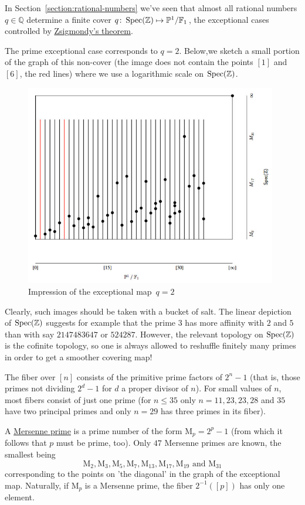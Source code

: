 In Section~\ref{section:rational-numbers} we've seen that almost all rational numbers $q \in \mathbb{Q}$ determine a finite cover $q\colon\operatorname{Spec}(\mathbb{Z}) \mapsto \mathbb{P}^1 / \mathbb{F}_1$, the exceptional cases controlled by \href{http://en.wikipedia.org/wiki/Zsigmondy's_theorem}{Zsigmondy's theorem}.

The prime exceptional case corresponds to $q=2$. Below,we sketch a small portion of the graph of this non-cover (the image does not contain the points $[1]$ and $[6]$, the red lines) where we use a logarithmic scale on $\operatorname{Spec}(\mathbb{Z})$.

\begin{figure}[ht]
  \centering
  \includegraphics[width=11cm]{exceptional-map/mersenne.jpg}
  \caption{Impression of the exceptional map~$q=2$}
  \label{figure:mersenne}
\end{figure}

Clearly, such images should be taken with a bucket of salt. The linear depiction of $\operatorname{Spec}(\mathbb{Z})$ suggests for example that the prime $3$ has more affinity with $2$ and $5$ than with say $2147483647$ or $524287$. However, the relevant topology on $\operatorname{Spec}(\mathbb{Z})$ is the cofinite topology, so one is always allowed to reshuffle finitely many primes in order to get a smoother covering  map!

The fiber over $[n]$ consists of the primitive prime factors of $2^n-1$ (that is, those primes not dividing $2^d-1$ for $d$ a proper divisor of $n$). For small values of $n$, most fibers consist of just one prime (for $n \leq 35$ only $n=11,23,23,28$ and $35$ have two principal primes and only $n=29$ has three primes in its fiber).

A \href{http://en.wikipedia.org/wiki/Mersenne_prime}{Mersenne prime} is a prime number of the form $\mathrm{M}_p = 2^p-1$ (from which it follows that $p$ must be prime, too). Only $47$ Mersenne primes are known, the smallest being
\begin{equation}
  \mathrm{M}_2,\mathrm{M}_3,\mathrm{M}_5,\mathrm{M}_7,\mathrm{M}_{13},\mathrm{M}_{17},\mathrm{M}_{19}\text{ and }\mathrm{M}_{31}
\end{equation}
corresponding to the points on 'the diagonal' in the graph of the exceptional map. Naturally, if $\mathrm{M}_p$ is a Mersenne prime, the fiber $2^{-1}([p])$ has only one element.

